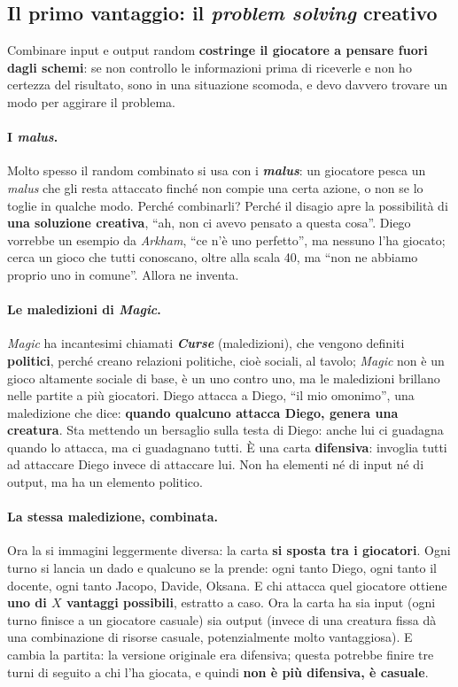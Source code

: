 \subsection{Il primo vantaggio: il \emph{problem solving} creativo}

Combinare input e output random \textbf{costringe il giocatore a pensare fuori dagli schemi}:
se non controllo le informazioni prima di riceverle e non ho certezza del risultato, sono in
una situazione scomoda, e devo davvero trovare un modo per aggirare il problema.

\paragraph{I \emph{malus}.} Molto spesso il random combinato si usa con i \textbf{\emph{malus}}:
un giocatore pesca un \emph{malus} che gli resta attaccato finché non compie una certa azione,
o non se lo toglie in qualche modo. Perché combinarli? Perché il disagio apre la possibilità
di \textbf{una soluzione creativa}, ``ah, non ci avevo pensato a questa cosa''. Diego vorrebbe
un esempio da \emph{Arkham}, ``ce n'è uno perfetto'', ma nessuno l'ha giocato; cerca un gioco
che tutti conoscano, oltre alla scala 40, ma ``non ne abbiamo proprio uno in comune''. Allora
ne inventa.

\paragraph{Le maledizioni di \emph{Magic}.} \emph{Magic} ha incantesimi chiamati
\textbf{\emph{Curse}} (maledizioni), che vengono definiti \textbf{politici}, perché creano
relazioni politiche, cioè sociali, al tavolo; \emph{Magic} non è un gioco altamente sociale
di base, è un uno contro uno, ma le maledizioni brillano nelle partite a più giocatori. Diego
attacca a Diego, ``il mio omonimo'', una maledizione che dice: \textbf{quando qualcuno attacca
Diego, genera una creatura}. Sta mettendo un bersaglio sulla testa di Diego: anche lui ci
guadagna quando lo attacca, ma ci guadagnano tutti. È una carta \textbf{difensiva}: invoglia
tutti ad attaccare Diego invece di attaccare lui. Non ha elementi né di input né di output, ma
ha un elemento politico.

\paragraph{La stessa maledizione, combinata.} Ora la si immagini leggermente diversa: la carta
\textbf{si sposta tra i giocatori}. Ogni turno si lancia un dado e qualcuno se la prende: ogni
tanto Diego, ogni tanto il docente, ogni tanto Jacopo, Davide, Oksana. E chi attacca quel
giocatore ottiene \textbf{uno di $X$ vantaggi possibili}, estratto a caso. Ora la carta ha sia
input (ogni turno finisce a un giocatore casuale) sia output (invece di una creatura fissa dà
una combinazione di risorse casuale, potenzialmente molto vantaggiosa). E cambia la partita:
la versione originale era difensiva; questa potrebbe finire tre turni di seguito a chi l'ha
giocata, e quindi \textbf{non è più difensiva, è casuale}.


